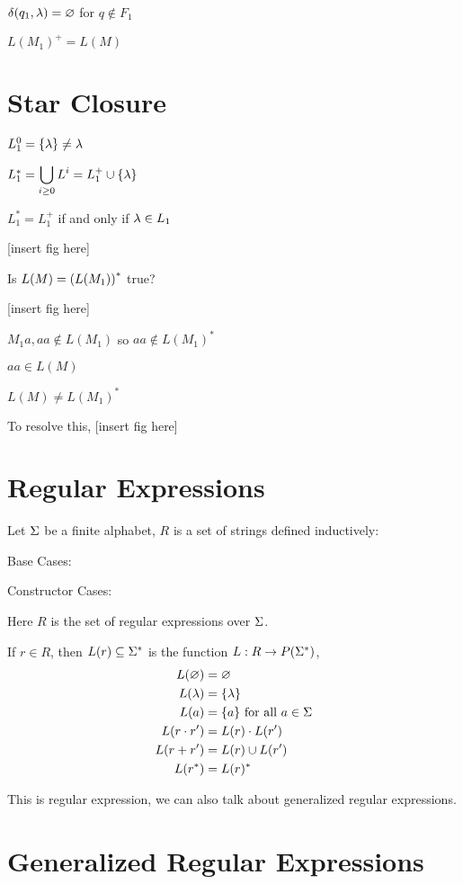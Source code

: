 \documentclass[11pt, cyan, night, 0.5in]{hw}
\begin{document}
$\delta(q_1,\lambda)=\varnothing$ for $q\notin F_1$

$L(M_1)^+=L(M)$

\section{Star Closure}

$L_1^0 = \{\lambda\}\neq \lambda$

$L_1^*=\displaystyle\bigcup_{i\ge0}L^i=L_1^+\cup\{\lambda\}$

$L_1^*=L_1^+$ if and only if $\lambda\in L_1$

[insert fig here]

Is $L(M)=\left(L(M_1)\right)^*$ true?


[insert fig here]

$M_1 a,aa\notin L(M_1)$ so $aa\notin L(M_1)^*$

$aa\in L(M)$

$L(M)\neq L(M_1)^*$

To resolve this, [insert fig here]

\section{Regular Expressions}

Let $\Sigma$ be a finite alphabet, $R$ is a set of strings defined inductively:

Base Cases:

Constructor Cases:

Here $R$ is the set of regular expressions over $\Sigma$.

If $r\in R$, then $L(r)\subseteq \Sigma^*$ is the function $L: R\to P(\Sigma^*)$,
\begin{align*}
    L(\varnothing)&=\varnothing\\
    L(\lambda)&=\{\lambda\}\\
    L(a)&=\{a\}\text{ for all }a\in\Sigma\\
    L(r\cdot r')&=L(r)\cdot L(r')\\
    L(r+r')&=L(r)\cup L(r')\\
    L(r^*)&=L(r)^*
\end{align*}

This is regular expression, we can also talk about generalized regular expressions.

\section{Generalized Regular Expressions}
\end{document}

